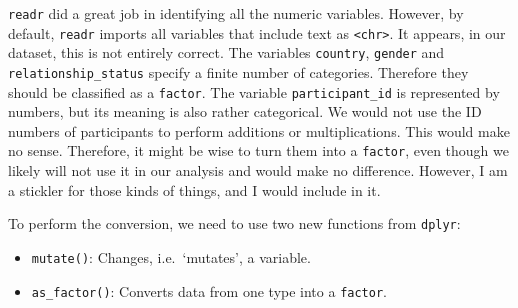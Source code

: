 \documentclass[
]{book}
\newenvironment{Shaded}{\begin{snugshade}}{\end{snugshade}}
\newcommand{\DocumentationTok}[1]{\textcolor[rgb]{0.56,0.35,0.01}{\textbf{\textit{#1}}}}
\newcommand{\FunctionTok}[1]{\textcolor[rgb]{0.00,0.00,0.00}{#1}}
\newcommand{\NormalTok}[1]{#1}
\begin{document}
\begin{Shaded}
\end{Shaded}

\texttt{readr} did a great job in identifying all the numeric variables. However, by default, \texttt{readr} imports all variables that include text as \texttt{\textless{}chr\textgreater{}}. It appears, in our dataset, this is not entirely correct. The variables \texttt{country}, \texttt{gender} and \texttt{relationship\_status} specify a finite number of categories. Therefore they should be classified as a \texttt{factor}. The variable \texttt{participant\_id} is represented by numbers, but its meaning is also rather categorical. We would not use the ID numbers of participants to perform additions or multiplications. This would make no sense. Therefore, it might be wise to turn them into a \texttt{factor}, even though we likely will not use it in our analysis and would make no difference. However, I am a stickler for those kinds of things, and I would include in it.

To perform the conversion, we need to use two new functions from \texttt{dplyr}:

\begin{itemize}
\item
  \texttt{mutate()}: Changes, i.e.~`mutates', a variable.
\item
  \texttt{as\_factor()}: Converts data from one type into a \texttt{factor}.
\end{itemize}
\end{document}
